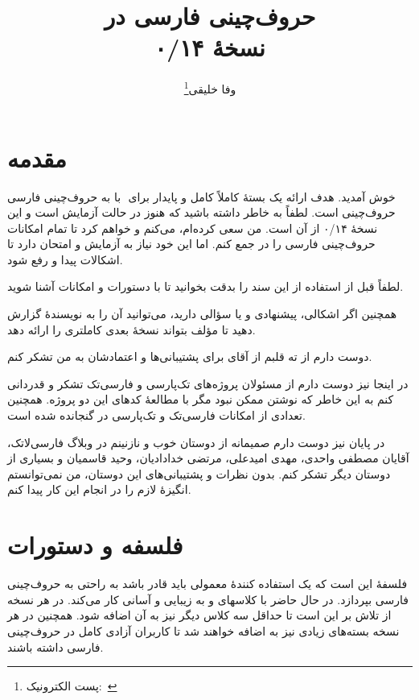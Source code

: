 \documentclass{report}
\title{حروف‌چینی فارسی در \eng{\XePersian}\\[0.2cm]نسخهٔ ۰/۱۴}
\author{وفا خلیقی\thanks{پست الکترونیک:~\eng{vafa.khalighi@students.mq.edu.au}}}
\begin{document}
\maths
\begin{farsi}
\maketitle
\tableofcontents
\chapter{مقدمه}
به حروف‌چینی فارسی ‪ ‬با ‪\eng{\XePersian} ‬خوش آمدید. هدف \eng{\XePersian} ارائه یک بستهٔ کاملاً کامل و پایدار برای حروف‌چینی است. لطفاً به خاطر داشته باشید که \eng{\XePersian} هنوز در حالت آزمایش است و این نسخهٔ ۰/۱۴ از آن است. من سعی کرده‌ام، می‌کنم و خواهم کرد تا تمام امکانات حروف‌چینی فارسی را در \eng{\XePersian} جمع کنم. اما این خود نیاز به آزمایش و امتحان دارد تا اشکالات پیدا و رفع شود.

لطفاً قبل از استفاده از \eng{\XePersian} این سند را بدقت بخوانید تا با دستورات و امکانات \eng{\XePersian} آشنا شوید.

همچنین اگر اشکالی، پیشنهادی و یا سؤالی دارید، می‌توانید آن را به نویسندهٔ \eng{\XePersian} گزارش دهید تا مؤلف \eng{\XePersian} بتواند نسخهٔ بعدی کاملتری را ارائه دهد.

دوست دارم از ته قلبم از آقای  برای پشتیبانی‌ها و اعتمادشان به من تشکر کنم.

در اینجا نیز دوست دارم از مسئولان پروژه‌های تک‌پارسی و فارسی‌تک تشکر و قدردانی کنم به این خاطر که نوشتن \eng{\XePersian} ممکن نبود مگر با مطالعهٔ کدهای این دو پروژه. همچنین تعدادی از امکانات فارسی‌تک و  تک‌پارسی در \eng{\XePersian} گنجانده شده است.

در پایان نیز دوست دارم صمیمانه از دوستان خوب و نازنینم در وبلاگ فارسی‌لاتک، آقایان مصطفی واحدی، مهدی امیدعلی، مرتضی خدادادیان، وحید قاسمیان و بسیاری از دوستان دیگر تشکر کنم. بدون نظرات و پشتیبانی‌های این دوستان، من نمی‌توانستم انگیزهٔ لازم را در انجام این کار پیدا کنم.
\chapter{فلسفه و دستورات \eng{\XePersian}}
فلسفهٔ \eng{\XePersian} این است که یک استفاده کنندهٔ معمولی باید قادر باشد به راحتی به حروف‌چینی فارسی بپردازد. در حال حاضر \eng{\XePersian} با کلاسهای  و  به زیبایی و آسانی کار می‌کند. در هر نسخه از \eng{\XePersian} تلاش بر این است تا حداقل سه کلاس دیگر نیز به آن اضافه شود. همچنین در هر نسخه بسته‌های زیادی نیز به \eng{\XePersian} اضافه خواهند شد تا کاربران آزادی کامل در حروف‌چینی فارسی داشته باشند.

\end{farsi}
\end{document}

